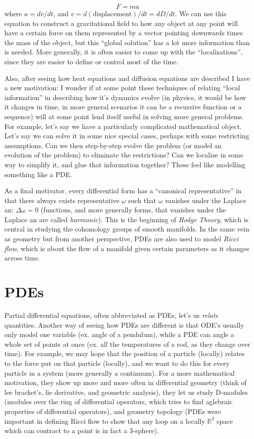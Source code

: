 \documentclass{book}
\newcommand{\R}{{\mathbb{R}}}
\begin{document}
\[
	F = ma
\]
where $a = dv/dt$, and $v = d(\textrm{displacement})/dt = dD/dt$. We can use this equation to construct a gravitational
field to how any object at any point will have a certain force on them represented by a vector pointing downwards times
the mass of the object, but this ``global solution'' has a lot more information than is needed. More generally, it is
often easier to come up with the ``localizations'', since they are easier to define or control most of the time.

Also, after seeing how heat equations and diffusion equations are described I have a new motivation:
I wonder if at some point these techniques of relating ``local information'' in describing how it's dynamics evolve (in
physics, it would be how it changes in time, in more general scenarios it can be a recursive function or a sequence)
will at some point lend itself useful in solving more general problems. For example, let's say we have a particularly complicated
mathematical object. Let's say we can solve it in some nice special cases, perhaps with some restricting assumptions.
Can we then step-by-step evolve the problem (or model an evolution of the problem) to eliminate the restrictions? Can we
localize in some way to simplify it, and glue that information together? These feel like modelling something like a PDE.

As a final motivator, every differential form has a ``canonical representative'' in that there always exists
representative $\omega$ such that $\omega$ vanishes under the Laplace an: $\Delta \omega = 0$ (functions, and more
generally forms, that vanishes under the Laplace an are called \emph{harmonic}). This is the beginning of \emph{Hodge
Theory}, which is central in studying the cohomology groups of smooth manifolds. In the same vein as geometry but from
another perspective, PDEs are also used to model  \emph{Ricci flow}, which is about the flow of a manifold given certain
parameters as it changes across time.

\section*{PDEs}

Partial differential equations, often abbreviated as PDEs, let's us \emph{relate} quantities. Another way of seeing how
PDEs are different is that ODE's usually only model one variable (ex. angle of a pendulum), while a PDE can angle
a whole set of points at once (ex. all the temperatures of a rod, as they change over time). For example, we may hope
that the position of a particle (locally) relates to the force put on that particle (locally), and we want to do this
for every particle in a system (more generally a continuum). For a more mathematical motivation, they show up more and
more often in differential geometry (think of lee bracket's, lie derivative, and geometric analysis), they let us study
D-modules (modules over the ring of differential operators, which tries to find aglebraic properties of differential
operators), and geometry topology (PDEs were important in defining Ricci flow to show that any loop on a locally $\R^3$
space which can contract to a point is in fact a 3-sphere).
\end{document}
